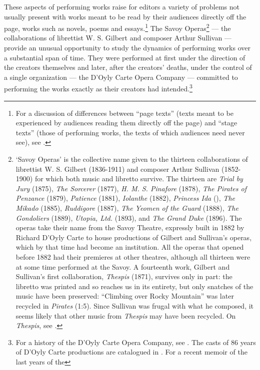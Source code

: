 \begin{paper}
These aspects of performing works raise for editors a variety of
problems not usually present with works meant to be read by their
audiences directly off the page, works such as novels, poems and
essays.\footnote{For a discussion of differences between ``page texts''
  (texts meant to be experienced by audiences reading them directly off
  the page) and ``stage texts'' (those of performing works, the texts of
  which audiences need never see), see \citealt[passim, but esp. pages 24--25]{broude_performance_2011}.} The Savoy Operas\footnote{`Savoy Operas' is the collective
  name given to the thirteen collaborations of librettist W. S. Gilbert
  (1836-1911) and composer Arthur Sullivan (1852-1900) for which both
  music and libretto survive. The thirteen are \emph{Trial by Jury}
  (1875), \emph{The Sorcerer} (1877), \emph{H. M. S. Pinafore} (1878),
  \emph{The Pirates of Penzance} (1879), \emph{Patience} (1881),
  \emph{Iolanthe} (1882), \emph{Princess Ida} (\citeyear{gilbert_princess_1884}), \emph{The Mikado}
  (1885), \emph{Ruddigore} (1887), \emph{The Yeomen of the Guard}
  (1888), \emph{The Gondoliers} (1889), \emph{Utopia, Ltd.} (1893), and
  \emph{The Grand Duke} (1896). The operas take their name from the
  Savoy Theatre, expressly built in 1882 by Richard D'Oyly Carte to
  house productions of Gilbert and Sullivan's operas, which by that time
  had become an institution. All the operas that opened before 1882 had
  their premieres at other theatres, although all thirteen were at some
  time performed at the Savoy. A fourteenth work, Gilbert and Sullivan's
  first collaboration, \emph{Thespis} (1871), survives only in part: the
  libretto was printed and so reaches us in its entirety, but only
  snatches of the music have been preserved: ``Climbing over Rocky
  Mountain'' was later recycled in \emph{Pirates} (1:5). Since Sullivan
  was frugal with what he composed, it seems likely that other music
  from \emph{Thespis} may have been recycled. On \emph{Thespis}, see \citealt{rees_thespis_1964}.} --- the collaborations of librettist W. S. Gilbert and
composer Arthur Sullivan --- provide an unusual opportunity to study the
dynamics of performing works over a substantial span of time. They were
performed at first under the direction of the creators themselves and
later, after the creators' deaths, under the control of a single
organization --- the D'Oyly Carte Opera Company --- committed to
performing the works exactly as their creators had intended.\footnote{For
  a history of the D'Oyly Carte Opera Company, see \citealt{joseph_doyly_1994}. The
  casts of 86 years of D'Oyly Carte productions are catalogued in \citealt{rollins_gilbert_1962}. For a recent memoir of the last years of the
}
\end{paper}
